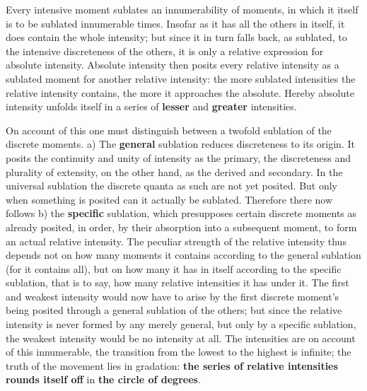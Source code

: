 \documentclass[12pt,a4paper,openany]{book}
\newcommand{\opage}[1]{\marginnote{\footnotesize\textit{[#1]}}}
\begin{document}
Every intensive moment sublates an innumerability of moments, in which it itself is to be sublated innumerable times. Insofar as it has all the others in itself, it does contain the whole intensity; but since it in turn falls back, as sublated, to the intensive discreteness of the others, it is only a relative expression for absolute intensity.
\setcounter{footnote}{0}%
\opage{45}Absolute intensity then posits every relative intensity as a sublated moment for another relative intensity: the more sublated intensities the relative intensity contains, the more it approaches the absolute. Hereby absolute intensity unfolds itself in a series of \textbf{lesser} and \textbf{greater} intensities.

On account of this one must distinguish between a twofold sublation of the discrete moments. a) The \textbf{general} sublation reduces discreteness to its origin. It posits the continuity and unity of intensity as the primary, the discreteness and plurality of extensity, on the other hand, as the derived and secondary. In the universal sublation the discrete quanta as such are not yet posited. But only when something is posited can it actually be sublated. Therefore there now follows b) the \textbf{specific} sublation, which presupposes certain discrete moments as already posited, in order, by their absorption into a subsequent moment, to form an actual relative intensity. The peculiar strength of the relative intensity thus depends not on how many moments it contains according to the general sublation (for it contains all), but on how many it has in itself according to the specific sublation, that is to say, how many relative intensities it has under it. The first and weakest intensity would now have to arise by the first discrete moment's being posited through a general sublation of the others; but since the relative intensity is never formed by any merely general, but only by a specific sublation, the weakest intensity would be no intensity at all. The intensities are on account of this innumerable, the transition from the lowest to the highest is infinite; the truth of the movement lies in gradation: \textbf{the series of relative intensities} \textbf{rounds itself off} in \textbf{the circle of degrees}.
\setcounter{footnote}{0}%
\end{document}
